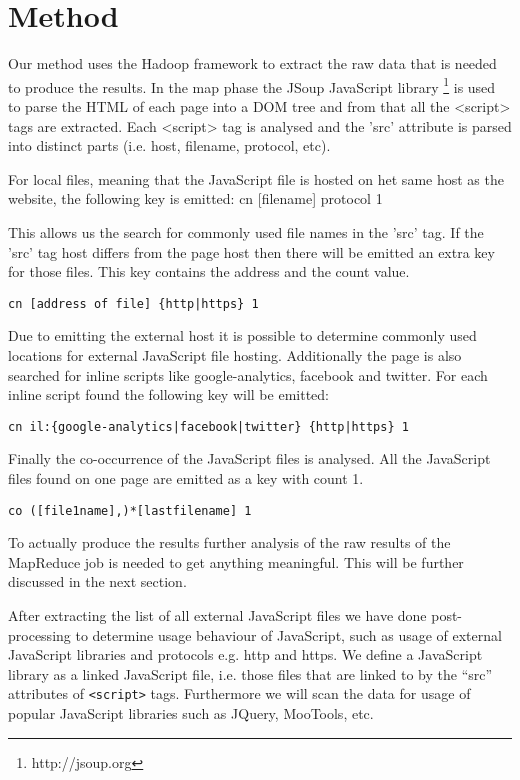\section{Method}
Our method uses the Hadoop framework to extract the raw data that is needed to produce the results. In the map phase the JSoup JavaScript library \footnote{http://jsoup.org} is used to parse the HTML of each page into a DOM tree and from that all the <script> tags are extracted. Each <script> tag is analysed and the 'src' attribute is parsed into distinct parts (i.e. host, filename, protocol, etc).

For local files, meaning that the JavaScript file is hosted on het same host as the website, the following key is emitted: cn [filename] protocol 1

This allows us the search for commonly used file names in the 'src' tag. If the 'src' tag host differs from the page host then there will be emitted an extra key for those files. This key contains the address and the count value.

\begin{lstlisting}
cn [address of file] {http|https} 1
\end{lstlisting}

Due to emitting the external host it is possible to determine commonly used locations for external JavaScript file hosting. Additionally the page is also searched for inline scripts like google-analytics, facebook and twitter. For each inline script found the following key will be emitted:

\begin{lstlisting}
cn il:{google-analytics|facebook|twitter} {http|https} 1
\end{lstlisting}

Finally the co-occurrence of the JavaScript files is analysed. All the JavaScript files found on one page are emitted as a key with count 1.

\begin{lstlisting}
co ([file1name],)*[lastfilename] 1
\end{lstlisting}

To actually produce the results further analysis of the raw results of the MapReduce job is needed to get anything meaningful. This will be further discussed in the next section.

After extracting the list of all external JavaScript files we have done post-processing to determine usage behaviour of JavaScript, such as usage of external JavaScript libraries and protocols e.g. http and https. We define a JavaScript library as a linked JavaScript file, i.e. those files that are linked to by the ``src'' attributes of \texttt{<script>} tags. Furthermore we will scan the data for usage of popular JavaScript libraries such as JQuery, MooTools, etc.
